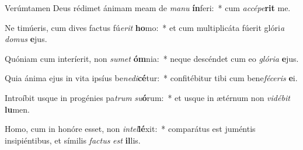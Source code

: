 \item Verúmtamen Deus rédimet ánimam meam de \textit{ma}\textit{nu} \textbf{ín}feri:~* cum \textit{ac}\textit{cé}\textit{pe}\textbf{rit} me.
\item Ne timúeris, cum dives factus fú\textit{e}\textit{rit} \textbf{ho}mo:~* et cum multiplicáta fúerit glóri\textit{a} \textit{do}\textit{mus} \textbf{e}jus.
\item Quóniam cum interíerit, non \textit{su}\textit{met} \textbf{óm}nia:~* neque descéndet cum eo \textit{gló}\textit{ri}\textit{a} \textbf{e}jus.
\item Quia ánima ejus in vita ipsíus be\textit{ne}\textit{di}\textbf{cé}tur:~* confitébitur tibi cum bene\textit{fé}\textit{ce}\textit{ris} \textbf{e}i.
\item Introíbit usque in progénies pa\textit{trum} \textit{su}\textbf{ó}rum:~* et usque in ætérnum non \textit{vi}\textit{dé}\textit{bit} \textbf{lu}men.
\item Homo, cum in honóre esset, non \textit{in}\textit{tel}\textbf{lé}xit:~* comparátus est juméntis insipiéntibus, et símilis \textit{fac}\textit{tus} \textit{est} \textbf{il}lis.
